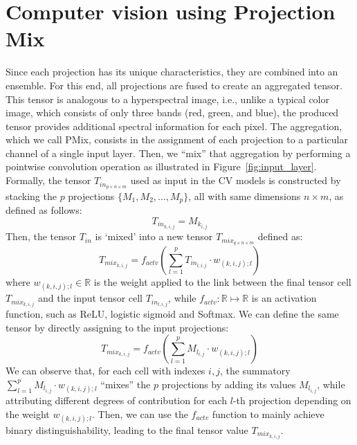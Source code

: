 


\section{Computer vision using Projection Mix}

Since each projection has its unique characteristics, they are combined into an ensemble. For this end, all projections are fused to create an aggregated tensor. This tensor is analogous to a hyperspectral image, i.e., unlike a typical color image, which consists of only three bands (red, green, and blue), the produced tensor provides additional spectral information for each pixel. The aggregation, which we call \gls{PMix}, consists in the assignment of each projection to a particular channel of a single input layer. Then, we ``mix'' that aggregation by performing a pointwise convolution operation as illustrated in Figure~\ref{fig:input_layer}. Formally, the tensor $T_{in_{p \times n \times m}}$ used as input in the \gls{CV} models is constructed by stacking the $p$ projections $\{M_1, M_2, ..., M_p\}$, all with same dimensions $n \times m$, as defined as follows:
\begin{equation}
    T_{in_{k,i,j}} = M_{k_{i,j}}
\end{equation}
\noindent Then, the tensor $T_{in}$ is `mixed' into a new tensor $T_{mix_{q \times n \times m}}$ defined as:
\begin{equation}
    T_{mix_{k,i,j}} = f_{actv}\left(\sum\limits_{l=1}^{p}T_{in_{l,i,j}} \cdot w_{(k,i,j);l}\right)
\end{equation} 
\noindent where $w_{(k,i,j);l} \in \mathbb{R}$ is the weight applied to the link between the final tensor cell $T_{mix_{k,i,j}}$ and the input tensor cell $T_{in_{l,i,j}}$, while $f_{actv}: \mathbb{R} \mapsto \mathbb{R}$ is an activation function, such as ReLU, logistic sigmoid and Softmax. We can define the same tensor by directly assigning to the input projections:
\begin{equation}
    \label{eq:mix}
    T_{mix_{k,i,j}} = f_{actv}\left(\sum\limits_{l=1}^{p}M_{l_{i,j}} \cdot w_{(k,i,j);l}\right)
\end{equation}
\noindent We can observe that, for each cell with indexes $i,j$, the summatory $\sum\limits_{l=1}^{p}M_{l_{i,j}} \cdot w_{(k,i,j);l}$ ``mixes'' the $p$ projections by adding its values $M_{l_{i,j}}$, while attributing different degrees of contribution for each $l$-th projection depending on the weight $w_{(k,i,j);l}$. Then, we can use the $f_{actv}$ function to mainly achieve binary distinguishability, leading to the final tensor value $T_{mix_{k,i,j}}$. 


